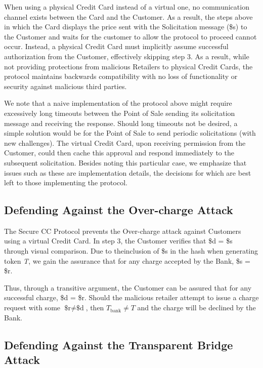 When using a physical Credit Card instead of a virtual one, no communication channel exists between the Card and the Customer.
As a result, the steps above in which the Card displays the price sent with the Solicitation message (\$s) to the Customer and waits for the customer to allow the protocol to proceed cannot occur.
Instead, a physical Credit Card must implicitly assume successful authorization from the Customer, effectively skipping step 3.
As a result, while not providing protections from malicious Retailers to physical Credit Cards, the protocol maintains backwards compatibility with no loss of functionality or security against malicious third parties.

We note that a naive implementation of the protocol above might require excessively long timeouts between the Point of Sale sending its solicitation message and receiving the response.
Should long timeouts not be desired, a simple solution would be for the Point of Sale to send periodic solicitations (with new challenges).
The virtual Credit Card, upon receiving permission from the Customer, could then cache this approval and respond immediately to the subsequent solicitation.
Besides noting this particular case, we emphasize that issues such as these are implementation details, the decisions for which are best left to those implementing the protocol.

\subsection{Defending Against the Over-charge Attack}

The Secure CC Protocol prevents the Over-charge attack against Customers using a virtual Credit Card.
In step 3, the Customer verifies that \$d = \$s through visual comparison.
Due to theinclusion of \$s in the hash when generating token \emph{T}, we gain the assurance that for any charge accepted by the Bank, \$s = \$r.

Thus, through a transitive argument, the Customer can be assured that for any successful charge, \$d = \$r.
Should the malicious retailer attempt to issue a charge request with some $\text{\$r} \neq \text{\$d}$, then $T_{\text{bank}} \neq T$ and the charge will be declined by the Bank.

\subsection{Defending Against the Transparent Bridge Attack}

